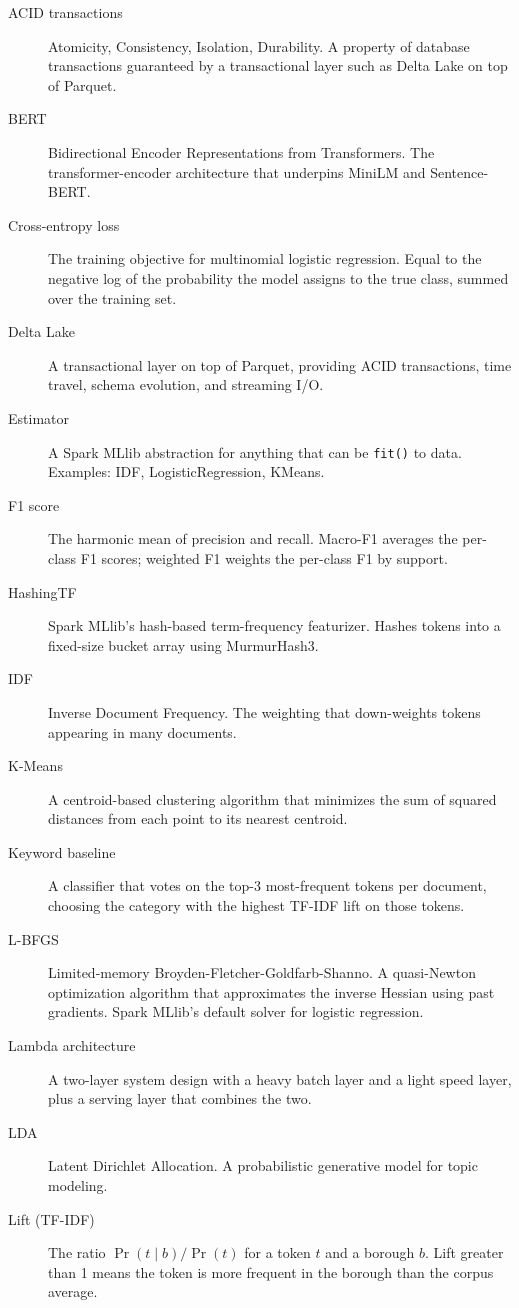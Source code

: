 \documentclass[11pt,letterpaper]{book}
\begin{document}
\begin{description}
\item[ACID transactions] Atomicity, Consistency, Isolation, Durability. A property of database transactions guaranteed by a transactional layer such as Delta Lake on top of Parquet.
\item[BERT] Bidirectional Encoder Representations from Transformers. The transformer-encoder architecture that underpins MiniLM and Sentence-BERT.
\item[Cross-entropy loss] The training objective for multinomial logistic regression. Equal to the negative log of the probability the model assigns to the true class, summed over the training set.
\item[Delta Lake] A transactional layer on top of Parquet, providing ACID transactions, time travel, schema evolution, and streaming I/O.
\item[Estimator] A Spark MLlib abstraction for anything that can be \texttt{fit()} to data. Examples: IDF, LogisticRegression, KMeans.
\item[F1 score] The harmonic mean of precision and recall. Macro-F1 averages the per-class F1 scores; weighted F1 weights the per-class F1 by support.
\item[HashingTF] Spark MLlib's hash-based term-frequency featurizer. Hashes tokens into a fixed-size bucket array using MurmurHash3.
\item[IDF] Inverse Document Frequency. The weighting that down-weights tokens appearing in many documents.
\item[K-Means] A centroid-based clustering algorithm that minimizes the sum of squared distances from each point to its nearest centroid.
\item[Keyword baseline] A classifier that votes on the top-3 most-frequent tokens per document, choosing the category with the highest TF-IDF lift on those tokens.
\item[L-BFGS] Limited-memory Broyden-Fletcher-Goldfarb-Shanno. A quasi-Newton optimization algorithm that approximates the inverse Hessian using past gradients. Spark MLlib's default solver for logistic regression.
\item[Lambda architecture] A two-layer system design with a heavy batch layer and a light speed layer, plus a serving layer that combines the two.
\item[LDA] Latent Dirichlet Allocation. A probabilistic generative model for topic modeling.
\item[Lift (TF-IDF)] The ratio $\Pr(t \mid b) / \Pr(t)$ for a token $t$ and a borough $b$. Lift greater than 1 means the token is more frequent in the borough than the corpus average.

\end{description}
\end{document}
